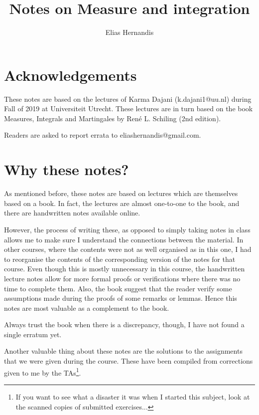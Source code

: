 \documentclass{book}
\author{Elias Hernandis}
\title{Notes on Measure and integration}
\begin{document}
	\maketitle
	
	\section{Acknowledgements}
	
	These notes are based on the lectures of Karma Dajani (k.dajani1@uu.nl) during Fall of 2019 at Universiteit Utrecht. These lectures are in turn based on the book Measures, Integrals and Martingales by René L. Schiling (2nd edition).
	
	Readers are asked to report errata to eliashernandis@gmail.com.
	
	\section{Why these notes?}
	
	As mentioned before, these notes are based on lectures which are themselves based on a book. In fact, the lectures are almost one-to-one to the book, and there are handwritten notes available online.
	
	However, the process of writing these, as opposed to simply taking notes in class allows me to make sure I understand the connections between the material. In other courses, where the contents were not as well organised as in this one, I had to reorganise the contents of the corresponding version of the notes for that course. Even though this is mostly unnecessary in this course, the handwritten lecture notes allow for more formal proofs or verifications where there was no time to complete them. Also, the book suggest that the reader verify some assumptions made during the proofs of some remarks or lemmas. Hence this notes are most valuable as a complement to the book.
	
	Always trust the book when there is a discrepancy, though, I have not found a single erratum yet.
	
	Another valuable thing about these notes are the solutions to the assignments that we were given during the course. These have been compiled from corrections given to me by the TAs\footnote{If you want to see what a disaster it was when I started this subject, look at the scanned copies of submitted exercises...}.
	
	\tableofcontents
	
	
	
	
	
	
	
	
	
	
	
	
\end{document}
